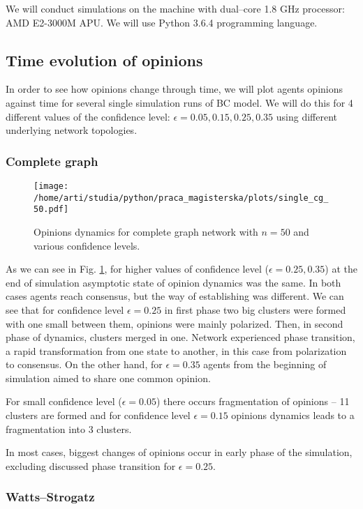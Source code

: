 \documentclass[a4paper, 12pt]{article}
\begin{document}
We will conduct simulations on the machine with dual--core 1.8 GHz processor: AMD E2-3000M APU. We will use Python 3.6.4 programming language.

\subsection{Time evolution of opinions}

In order to see how opinions change through time, we will plot agents opinions against time for several single simulation runs of BC model. We will do this for 4 different values of the confidence level: $\epsilon=0.05, 0.15, 0.25, 0.35$ using different underlying network topologies.

\subsubsection{Complete graph}

\begin{figure}[H]
		\centering
		\texttt{[image: /home/arti/studia/python/praca\_magisterska/plots/single\_cg\_50.pdf]}
		\caption{Opinions dynamics for complete graph network with $n=50$ and various confidence levels.}
		\label{f2}
\end{figure}
As we can see in Fig. \ref{f2}, for higher values of confidence level ($\epsilon=0.25, 0.35$) at the end of simulation asymptotic state of opinion dynamics was the same. In both cases agents reach consensus, but the way of establishing was different.
We can see that for confidence level $\epsilon=0.25$ in first phase two big clusters were formed with one small between them, opinions were mainly polarized. Then, in second phase of dynamics, clusters merged in one. Network experienced phase transition, a rapid transformation from one state to another, in this case from polarization to consensus. On the other hand, for $\epsilon=0.35$ agents from the beginning of simulation aimed to share one common opinion.
\indent


For small confidence level ($\epsilon=0.05$) there occurs fragmentation of opinions -- 11 clusters are formed and for confidence level $\epsilon=0.15$ opinions dynamics leads to a fragmentation into 3 clusters.
\indent

In most cases, biggest changes of opinions occur in early phase of the simulation, excluding discussed phase transition for $\epsilon=0.25$.

\subsubsection{Watts--Strogatz}
\end{document}
